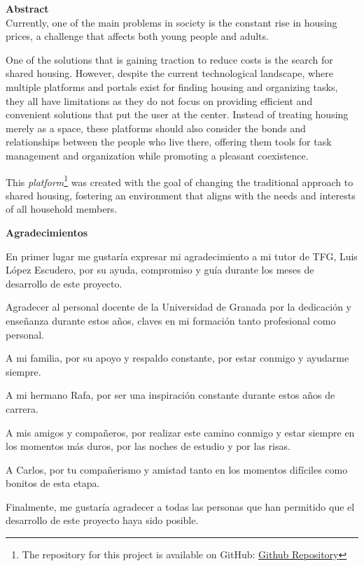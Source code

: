 \noindent\textbf{Abstract}\\

Currently, one of the main problems in society is the constant rise in housing prices, a challenge that affects both young people and adults.

One of the solutions that is gaining traction to reduce costs is the search for 
shared housing. However, despite the current technological landscape, where 
multiple platforms and portals exist for finding housing and organizing tasks, 
they all have limitations as they do not focus on providing efficient and 
convenient solutions that put the user at the center. Instead of treating 
housing merely as a space, these platforms should also consider the bonds and 
relationships between the people who live there, offering them tools for task 
management and organization while promoting a pleasant coexistence.

This \textit{platform}\footnote{The repository for this project is available on GitHub: 
\href{https://github.com/alonsodm12/TFG_COHOUSING}{Github Repository}} was created with the goal of changing the traditional approach to 
shared housing, fostering an environment that aligns with the needs and 
interests of all household members.


\cleardoublepage
\begin{center}
	{\large\bfseries Agradecimientos}\\
\end{center}
En primer lugar me gustaría expresar mi agradecimiento a mi tutor de TFG, Luis López Escudero, por su ayuda, compromiso y guía durante los meses de desarrollo de este proyecto.

Agradecer al personal docente de la Universidad de Granada por la dedicación y enseñanza durante estos años, claves en mi formación tanto profesional como personal.

A mi familia, por su apoyo y respaldo constante, por estar conmigo y ayudarme siempre.

A mi hermano Rafa, por ser una inspiración constante durante estos años de carrera.

A mis amigos y compañeros, por realizar este camino conmigo y estar siempre en los momentos más duros, por las noches de estudio y por las risas.

A Carlos, por tu compañerismo y amistad tanto en los momentos difíciles como bonitos de esta etapa. 

Finalmente, me gustaría agradecer a todas las personas que han permitido que el desarrollo de este proyecto haya sido posible.
